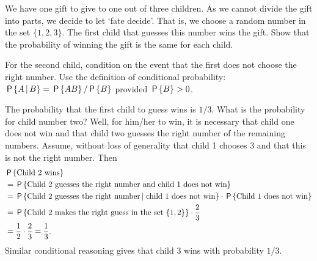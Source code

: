 \documentclass[queueing-book]{subfiles}
\begin{document}
\begin{exercise}\label{ex:l-109}
 We have one gift to give to one out of three children. As we cannot
 divide the gift into parts, we decide to let `fate decide'. That
 is, we choose a random number in the set $\{1, 2, 3\}$. The first
 child that guesses this number wins the gift. Show that the
 probability of winning the gift is the same for each child.
\begin{hint}
 For the second child, condition on the event that the first does not choose the right number.
 Use the definition of conditional probability:
 $\P{A\given B} = \P{AB}/\P{B}$ provided $\P{B}>0$.
\end{hint}
\begin{solution}
 The probability that the first child to guess  wins is
 $1/3$. What is the probability for child number two? Well, for
 him/her to win, it is necessary that child one does not win and
 that child two guesses the right number of the remaining
 numbers. Assume, without loss of generality that child 1 chooses
 $3$ and that this is not the right number. Then
 \begin{equation*}
 \begin{split}
&\P{\text{Child 2 wins}} \\
&= \P{\text{Child 2 guesses the right number and child 1 does not win}} \\
&= \P{\text{Child 2 guesses the right number} \given\, \text{child 1 does not win}}
\cdot \P{\text{Child 1 does not win}} \\
&= \P{\text{Child 2 makes the right guess in the set $\{1,2\}$}}\cdot \frac 23 \\
&= \frac 1 2\cdot \frac 23 = \frac 1 3.
 \end{split}
 \end{equation*}
 Similar conditional reasoning gives that child 3 wins with probability $1/3$.
\end{solution}
\end{exercise}


\end{document}
